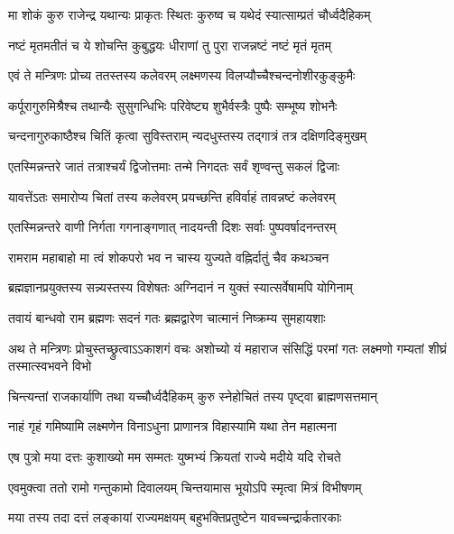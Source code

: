\twolineshloka
{मा शोकं कुरु राजेन्द्र यथान्यः प्राकृतः स्थितः}
{कुरुष्व च यथेदं स्यात्साम्प्रतं चौर्ध्वदैहिकम्}%

\twolineshloka
{नष्टं मृतमतीतं च ये शोचन्ति कुबुद्धयः}
{धीराणां तु पुरा राजन्नष्टं नष्टं मृतं मृतम्}%

\twolineshloka
{एवं ते मन्त्रिणः प्रोच्य ततस्तस्य कलेवरम्}
{लक्ष्मणस्य विलप्यौच्चैश्चन्दनोशीरकुङ्कुमैः}%

\twolineshloka
{कर्पूरागुरुमिश्रैश्च तथान्यैः सुसुगन्धिभिः}
{परिवेष्ट्य शुभैर्वस्त्रैः पुष्पैः सम्भूष्य शोभनैः}%

\twolineshloka
{चन्दनागुरुकाष्ठैश्च चितिं कृत्वा सुविस्तराम्}
{न्यदधुस्तस्य तद्गात्रं तत्र दक्षिणदिङ्मुखम्}%

\twolineshloka
{एतस्मिन्नन्तरे जातं तत्राश्चर्यं द्विजोत्तमाः}
{तन्मे निगदतः सर्वं शृण्वन्तु सकलं द्विजाः}%

\twolineshloka
{यावत्तेंऽतः समारोप्य चितां तस्य कलेवरम्}
{प्रयच्छन्ति हविर्वाहं तावन्नष्टं कलेवरम्}%

\twolineshloka
{एतस्मिन्नन्तरे वाणी निर्गता गगनाङ्गणात्}
{नादयन्ती दिशः सर्वाः पुष्पवर्षादनन्तरम्}%

\twolineshloka
{रामराम महाबाहो मा त्वं शोकपरो भव}
{न चास्य युज्यते वह्निर्दातुं चैव कथञ्चन}%

\twolineshloka
{ब्रह्मज्ञानप्रयुक्तस्य सन्न्यस्तस्य विशेषतः}
{अग्निदानं न युक्तं स्यात्सर्वेषामपि योगिनाम्}%

\twolineshloka
{तवायं बान्धवो राम ब्रह्मणः सदनं गतः}
{ब्रह्मद्वारेण चात्मानं निष्क्रम्य सुमहायशाः}%

\threelineshloka
{अथ ते मन्त्रिणः प्रोचुस्तच्छ्रुत्वाऽऽकाशगं वचः}
{अशोच्यो यं महाराज संसिद्धिं परमां गतः}
{लक्ष्मणो गम्यतां शीघ्रं तस्मात्स्वभवने विभो}%

\twolineshloka
{चिन्त्यन्तां राजकार्याणि तथा यच्चौर्ध्वदैहिकम्}
{कुरु स्नेहोचितं तस्य पृष्ट्वा ब्राह्मणसत्तमान्}%


\twolineshloka
{नाहं गृहं गमिष्यामि लक्ष्मणेन विनाऽधुना}
{प्राणानत्र विहास्यामि यथा तेन महात्मना}%

\twolineshloka
{एष पुत्रो मया दत्तः कुशाख्यो मम सम्मतः}
{युष्मभ्यं क्रियतां राज्ये मदीये यदि रोचते}%

\twolineshloka
{एवमुक्त्वा ततो रामो गन्तुकामो दिवालयम्}
{चिन्तयामास भूयोऽपि स्मृत्वा मित्रं विभीषणम्}%

\twolineshloka
{मया तस्य तदा दत्तं लङ्कायां राज्यमक्षयम्}
{बहुभक्तिप्रतुष्टेन यावच्चन्द्रार्कतारकाः}%

